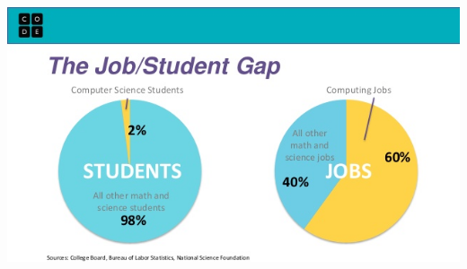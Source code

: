 \documentclass{beamer}
\begin{document}
\begin{frame}
  \frametitle{}
\begin{center}
\includegraphics[scale=0.5]{images/jobs1}
\end{center}
\end{frame}
\end{document}
